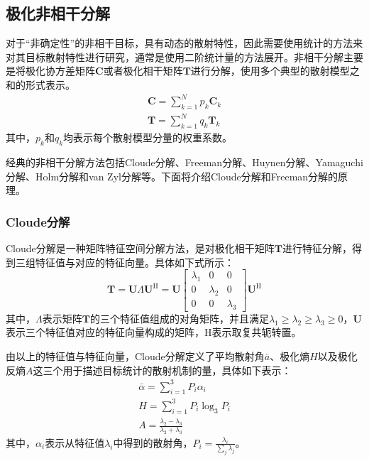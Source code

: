 \subsection{极化非相干分解}
对于“非确定性”的非相干目标，具有动态的散射特性，因此需要使用统计的方法来对其目标散射特性进行研究，通常是使用二阶统计量的方法展开。非相干分解主要是将极化协方差矩阵$\textbf{C}$或者极化相干矩阵$\textbf{T}$进行分解，使用多个典型的散射模型之和的形式表示。
\begin{gather}
    \textbf{C}=\sum_{k=1}^N{p_k\textbf{C}_k}
    \\
    \textbf{T}=\sum_{k=1}^N{q_k\textbf{T}_k}
\end{gather}
其中，$p_k$和$q_k$均表示每个散射模型分量的权重系数。

经典的非相干分解方法包括Cloude分解、Freeman分解、Huynen分解、Yamaguchi分解、Holm分解和van Zyl分解等。下面将介绍Cloude分解和Freeman分解的原理。
\subsubsection{Cloude分解}
Cloude分解是一种矩阵特征空间分解方法，是对极化相干矩阵$\textbf{T}$进行特征分解，得到三组特征值与对应的特征向量。具体如下式所示：
\begin{equation}
    \textbf{T}=\textbf{U} \Lambda \textbf{U}^{\text{H}}=\textbf{U}\left[\begin{array}{ccc}
            \lambda_1 & 0         & 0         \\
            0         & \lambda_2 & 0         \\
            0         & 0         & \lambda_3
        \end{array}\right] \textbf{U}^{\text{H}}
\end{equation}
其中，$\Lambda$表示矩阵$\textbf{T}$的三个特征值组成的对角矩阵，并且满足$\lambda_1 \geqslant \lambda_2 \geqslant \lambda_3 \geqslant 0$，$\textbf{U}$表示三个特征值对应的特征向量构成的矩阵，$\text{H}$表示取复共轭转置。

由以上的特征值与特征向量，Cloude分解定义了平均散射角$\bar{a}$、极化熵$H$以及极化反熵$A$这三个用于描述目标统计的散射机制的量，具体如下表示：
\begin{gather}
    \bar{\alpha}=\sum_{i=1}^3{P_i\alpha _i}
    \\
    H=\sum_{i=1}^3{P_i\log _3P_i}
    \\
    A=\frac{\lambda _2-\lambda _3}{\lambda _2+\lambda _3}
\end{gather}
其中，$\alpha_i$表示从特征值$\lambda_i$中得到的散射角，$P_i=\frac{\lambda _i}{\sum_j{\lambda _j}}$。

